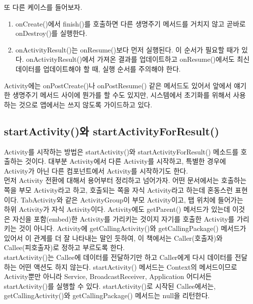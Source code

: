 또 다른 케이스를 들어보자.
\begin{enumerate}
\item onCreate()에서 finish()를 호출하면 다른 생명주기 메서드를 거치지 않고 곧바로 onDestroy()를 실행한다.
\item onActivityResult()는 onResume()보다 먼저 실행된다.
이 순서가 필요할 때가 있다. onActivityResult()에서 가져온 결과를 업데이트하고
onResume()에서도 최신 데이터를 업데이트해야 할 때, 실행 순서를 주의해야 한다.
\end{enumerate}

Activity에는 onPostCreate()나 onPostResume() 같은 메서드도 있어서 앞에서 얘기한 생명주기 메서드 사이에 뭔가를 할 수도 있지만, 시스템에서 초기화를 위해서 사용하는 것으로 앱에서는 쓰지 않도록 가이드하고 있다.

\subsection{startActivity()와 startActivityForResult()}
Activity를 시작하는 방법은 startActivity()와 startActivityForResult() 메소드를 호출하는 것이다. 대부분 Activity에서 다른 Activity를 시작하고, 특별한 경우에 Activity가 아닌 다른 컴포넌트에서 Activity를 시작하기도 한다.\\

먼저 Activity 전환에 대해서 용어부터 정리하고 넘어가자.
어떤 문서에서는 호출하는 쪽을 부모 Activity라고 하고, 호출되는 쪽을 자식 Activity라고 하는데 혼동스런 표현이다. TabActivity와 같은 ActivityGroup이 부모 Activity이고, 탭 위치에 들어가는 하위 Activity가 자식 Activity이다. Activity에도 getParent() 메서드가 있는데 이것은 자신을 포함(embed)한 Activity를 가리키는 것이지 자기를 호출한 Activity를 가리키는 것이 아니다. 
Activity에 getCallingActivity()와 getCallingPackage() 메서드가 있어서 이 관계를 더 잘 나타내는 말인 듯하여, 이 책에서는 Caller(호출자)와 Callee(피호출자)로 정하고 부르도록 한다.\\

startActivity()는 Callee에 데이터를 전달하기만 하고 Caller에게 다시 데이터를 전달하는 어떤 액션도 하지 않는다.
startActivity() 메서드는 Context의 메서드이므로 Activity뿐만 아니라 Service, BroadcastReceiver, Application 어디서든 startActivity()를 실행할 수 있다.
startActivity()로 시작된 Callee에서는, getCallingActivity()와 getCallingPackage() 메서드는 null을 리턴한다.\\

